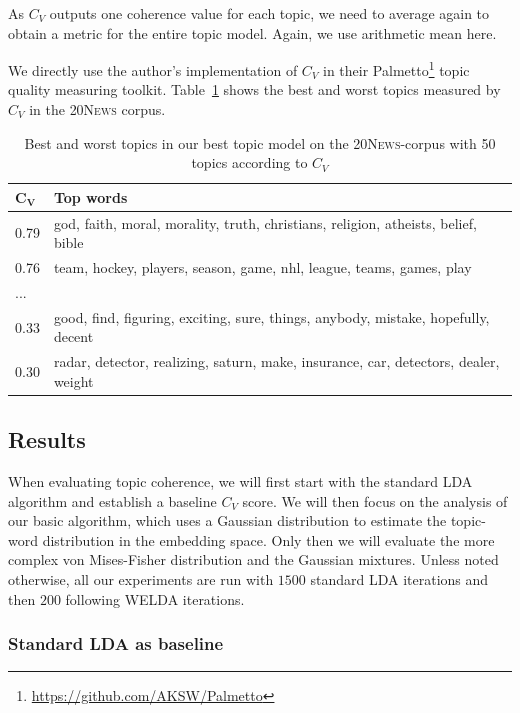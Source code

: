 \documentclass[
        a4paper,
        titlepage,
        twoside,
        parskip
        ]{scrbook}
\theoremstyle{break}
\begin{document}
As $C_V$ outputs one coherence value for each topic, we need to average again to obtain a metric for the entire topic model.
Again, we use arithmetic mean here.

We directly use the author's implementation of $C_V$ in their Palmetto\footnote{\url{https://github.com/AKSW/Palmetto}} topic quality measuring toolkit.
Table~\ref{table:best_worst_cv_topics} shows the best and worst topics measured by $C_V$ in the \textsc{20News} corpus.
\begin{table}[]
  \centering
  \caption{Best and worst topics in our best topic model on the \textsc{20News}-corpus with 50 topics according to $C_V$}
  \begin{tabular}{ll}
  \hline
  $\mathbf{C_V}$ & \textbf{Top words} \\ \hline
  0.79               & god, faith, moral, morality, truth, christians, religion, atheists, belief, bible \\
  0.76               & team, hockey, players, season, game, nhl, league, teams, games, play \\
  ...                &                    \\
  0.33               & good, find, figuring, exciting, sure, things, anybody, mistake, hopefully, decent \\
  0.30               & radar, detector, realizing, saturn, make, insurance, car, detectors, dealer, weight \\ \hline
  \end{tabular}
  \label{table:best_worst_cv_topics}
\end{table}

\subsection{Results}

When evaluating topic coherence, we will first start with the standard LDA algorithm and establish a baseline $C_V$ score.
We will then focus on the analysis of our basic algorithm, which uses a Gaussian distribution to estimate the topic-word distribution in the embedding space.
Only then we will evaluate the more complex von Mises-Fisher distribution and the Gaussian mixtures.
Unless noted otherwise, all our experiments are run with $1500$ standard LDA iterations and then $200$ following WELDA iterations.

\subsubsection{Standard LDA as baseline}
\end{document}
